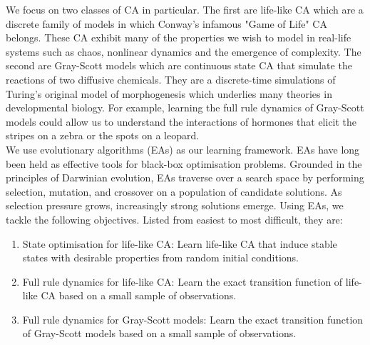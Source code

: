We focus on two classes of CA in particular. The first are life-like CA which are a discrete family of models in which Conway's infamous "Game of Life" CA belongs. These CA exhibit many of the properties we wish to model in real-life systems such as chaos, nonlinear dynamics and the emergence of complexity. The second are Gray-Scott models which are continuous state CA that simulate the reactions of two diffusive chemicals. They are a discrete-time simulations of Turing's original model of morphogenesis which underlies many theories in developmental biology. For example, learning the full rule dynamics of Gray-Scott models could allow us to understand the interactions of hormones that elicit the stripes on a zebra or the spots on a leopard.\\

We use evolutionary algorithms (EAs) as our learning framework. EAs have long been held as effective tools for black-box optimisation problems. Grounded in the principles of Darwinian evolution, EAs traverse over a search space by performing selection, mutation, and crossover on a population of candidate solutions. As selection pressure grows, increasingly strong solutions emerge. Using EAs, we tackle the following objectives. Listed from easiest to most difficult, they are:

\begin{enumerate}
    \item State optimisation for life-like CA: Learn life-like CA that induce stable states with desirable properties from random initial conditions.
    \item Full rule dynamics for life-like CA: Learn the exact transition function of life-like CA based on a small sample of observations.
    \item Full rule dynamics for Gray-Scott models: Learn the exact transition function of Gray-Scott models based on a small sample of observations.
\end{enumerate}

